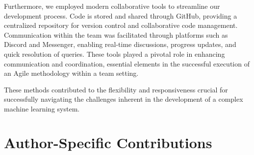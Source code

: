 Furthermore, we employed modern collaborative tools to streamline our development process. Code is stored and shared through GitHub, providing a centralized repository for version control and collaborative code management. Communication within the team was facilitated through platforms such as Discord and Messenger, enabling real-time discussions, progress updates, and quick resolution of queries. These tools played a pivotal role in enhancing communication and coordination, essential elements in the successful execution of an Agile methodology within a team setting.

These methods contributed to the flexibility and responsiveness crucial for successfully navigating the challenges inherent in the development of a complex machine learning system. 

\section{Author-Specific Contributions}